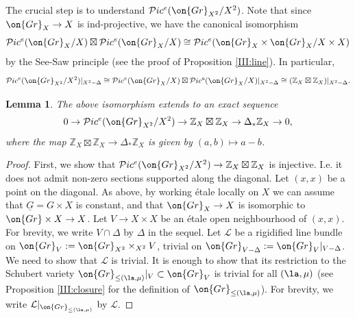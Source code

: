 \documentclass[]{pcmi}
\theoremstyle{plain}
\newtheorem{lem}[equation]{Lemma}
\theoremstyle{remark}
\theoremstyle{definition}
\newcommand{\bZ}{{\mathbb Z}}
\newcommand{\mL}{{\mathcal L}}
\newcommand{\mP}{{\mathcal P}}
\newcommand{\Gr}{{\on{Gr}}}
\begin{document}
The crucial step is to understand $\mP ic^e(\Gr_{X^2}/X^2)$. Note that since $\Gr_X\to X$ is ind-projective, we have the canonical isomorphism
\[ \mP ic^e(\Gr_X/X)\boxtimes \mP ic^e(\Gr_X/X)\cong\mP ic^e(\Gr_X\times\Gr_X/X\times X)\]
by the See-Saw principle (see the proof of Proposition \ref{III:line}). In particular, 
\[\mP ic^e(\Gr_{X^2}/X^2)|_{X^2-\Delta}\cong \mP ic^e(\Gr_X/X)\boxtimes \mP ic^e(\Gr_X/X)|_{X^2-\Delta}\cong(\bZ_X\boxtimes\bZ_X)|_{X^2-\Delta}.\]
\begin{lem}\label{Pic X2}
The above isomorphism extends to an exact sequence
\[0\to \mP ic^e(\Gr_{X^2}/X^2)\to \bZ_X\boxtimes\bZ_X\to \Delta_*\bZ_X\to 0, \]
where the map $\bZ_X\boxtimes\bZ_X\to \Delta_*\bZ_X$ is given by $(a,b)\mapsto a-b$.
\end{lem}
\begin{proof}
First, we show that $ \mP ic^e(\Gr_{X^2}/X^2)\to  \bZ_X\boxtimes\bZ_X$ is injective. I.e. it does not admit non-zero sections supported along the diagonal. Let $(x,x)$ be a point on the diagonal. As above, by working \'etale locally on $X$ we can assume that $\underline G=G\times X$ is constant, and that $\Gr_{X}\to X$ is isomorphic to $\Gr\times X\to X$.  Let $V\to X\times X$ be an \'etale open neighbourhood of $(x,x)$. For brevity, we write $V\cap\Delta$ by $\Delta$ in the sequel.
Let $\mL$ be a rigidified line bundle on $\Gr_V:=\Gr_{X^2}\times_{X^2}V$, trivial on $\Gr_{V-\Delta}:=\Gr_V|_{V-\Delta}$. We need to show that $\mL$ is trivial. It is enough to show that its restriction to the Schubert variety $\Gr_{\leq(\la,\mu)}|_V\subset \Gr_V$ is trivial for all $(\la,\mu)$ (see Proposition \ref{III:closure} for the definition of $\Gr_{\leq(\la,\mu)}$). For brevity, we write $\mL|_{\Gr_{\leq(\la,\mu)}}$ by $\mL$.


\end{proof}
\end{document}
